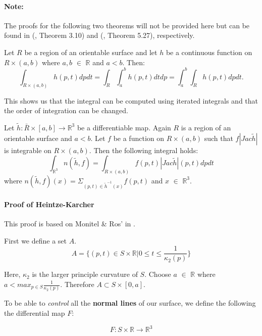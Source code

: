 \documentclass[a4paper,12pt]{report}
\begin{document}
\paragraph{Note:} The proofs for the following two theorems will not be provided here but can be found in (\cite{spivak}, Theorem 3.10) and (\cite{montiel}, Theorem 5.27), respectively.

\begin{theorem}
Let $R$ be a region of an orientable surface and let $h$ be a continuous function on $R \times (a,b)$ where $a,b$ $\in$ $\mathbb{R}$ and $a < b$. Then: 
\[
\int_{R \times (a,b)} h(p,t) dp dt = \int_{R} \int_{a}^{b} h(p,t) dt dp = \int_{a}^{b} \int_{R} h(p,t) dp dt.
\]
\end{theorem}

This shows us that the integral can be computed using iterated integrals and that the order of integration can be changed.\par

\begin{theorem}
Let $\tilde{h} : \bar{R} \times [a,b] \rightarrow \mathbb{R}^{3}$ be a differentiable map. Again $R$ is a region of an orientable surface and $a < b$. Let $f$ be a function on $R \times (a,b)$ such that $f|Jac \tilde{h} |$ is integrable on $R \times (a,b)$. Then the following integral holds:
\[
\int_{\mathbb{R}^{3}} n(\tilde{h},f) = \int_{R \times (a,b)} f(p,t)|Jac \tilde{h} |(p,t) dpdt
\]
where $n(\tilde{h},f)(x) = \Sigma_{(p,t)\in \tilde{h}^{-1}(x)} f(p,t)$ and $x$ $\in$ $\mathbb{R}^{3}$.
\end{theorem}

\paragraph{Proof of Heintze-Karcher} 
This proof is based on Monitel \& Ros' in \cite{montiel}.\newline

First we define a set $A$.
\[
A = \{(p,t) \in S \times \mathbb{R} | 0 \leq t \leq \frac{1}{\kappa_{2}(p)} \}
\]

Here, $\kappa_{2}$ is the larger principle curvature of $S$. Choose $a$ $\in$ $\mathbb{R}$ where $a < max_{p \in S} \frac{1}{\kappa_{2}(p)}$. Therefore $A \subset S \times [0,a]$.

To be able to \textit{control} all the \textbf{normal lines} of our surface, we define the following the differential map $F$:

\begin{equation}
F: S \times \mathbb{R} \rightarrow \mathbb{R}^{3}
\end{equation}
\end{document}
